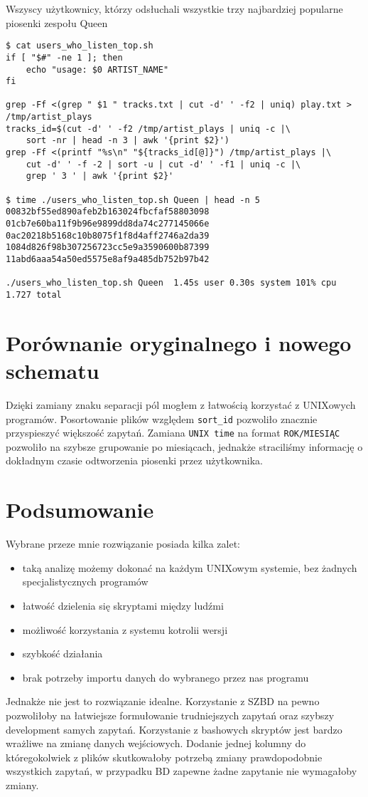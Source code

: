 \documentclass[a4paper,11pt]{article}
\begin{document}
\bigskip
\noindent
Wszyscy użytkownicy, którzy odsłuchali wszystkie trzy najbardziej popularne piosenki zespołu Queen
\begin{footnotesize}
\begin{verbatim}
$ cat users_who_listen_top.sh
if [ "$#" -ne 1 ]; then
    echo "usage: $0 ARTIST_NAME"
fi

grep -Ff <(grep " $1 " tracks.txt | cut -d' ' -f2 | uniq) play.txt > /tmp/artist_plays
tracks_id=$(cut -d' ' -f2 /tmp/artist_plays | uniq -c |\
    sort -nr | head -n 3 | awk '{print $2}')
grep -Ff <(printf "%s\n" "${tracks_id[@]}") /tmp/artist_plays |\
    cut -d' ' -f -2 | sort -u | cut -d' ' -f1 | uniq -c |\
    grep ' 3 ' | awk '{print $2}'

$ time ./users_who_listen_top.sh Queen | head -n 5
00832bf55ed890afeb2b163024fbcfaf58803098
01cb7e60ba11f9b96e9899dd8da74c277145066e
0ac20218b5168c10b8075f1f8d4aff2746a2da39
1084d826f98b307256723cc5e9a3590600b87399
11abd6aaa54a50ed5575e8af9a485db752b97b42

./users_who_listen_top.sh Queen  1.45s user 0.30s system 101% cpu 1.727 total
\end{verbatim}
\end{footnotesize}


\section{Porównanie oryginalnego i nowego schematu}

Dzięki zamiany znaku separacji pól mogłem z łatwością korzystać z UNIXowych programów. Posortowanie plików względem \texttt{sort\_id} pozwoliło znacznie przyspieszyć większość zapytań. Zamiana \texttt{UNIX time} na format \texttt{ROK/MIESIĄC} pozwoliło na szybsze grupowanie po miesiącach, jednakże straciliśmy informację o dokładnym czasie odtworzenia piosenki przez użytkownika.

\section{Podsumowanie}

Wybrane przeze mnie rozwiązanie posiada kilka zalet:
\begin{itemize}
    \item taką analizę możemy dokonać na każdym UNIXowym systemie, bez żadnych specjalistycznych programów
    \item łatwość dzielenia się skryptami między ludźmi
    \item możliwość korzystania z systemu kotrolii wersji
    \item szybkość działania
    \item brak potrzeby importu danych do wybranego przez nas programu
\end{itemize}

Jednakże nie jest to rozwiązanie idealne. Korzystanie z SZBD na pewno pozwoliłoby na łatwiejsze formułowanie trudniejszych zapytań oraz szybszy development samych zapytań. Korzystanie z bashowych skryptów jest bardzo wrażliwe na zmianę danych wejściowych. Dodanie jednej kolumny do któregokolwiek z plików skutkowałoby potrzebą zmiany prawdopodobnie wszystkich zapytań, w przypadku BD zapewne żadne zapytanie nie wymagałoby zmiany.
\end{document}
